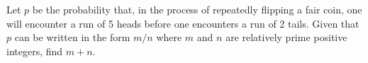 Let $p$ be the probability that, in the process of repeatedly flipping a fair coin, one will encounter a run of 5 heads before one encounters a run of 2 tails.  Given that $p$ can be written in the form $m/n$ where $m$ and $n$ are relatively prime positive integers, find $m+n$.